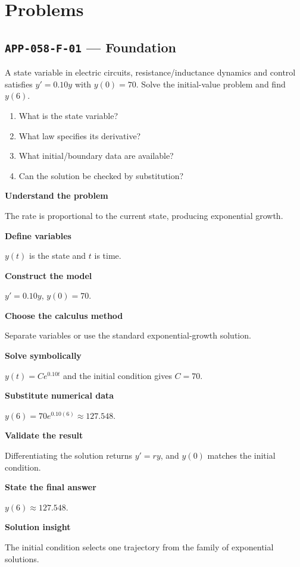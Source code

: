 \documentclass[11pt]{book}
\newcommand{\pid}[1]{\texttt{#1}}
\begin{document}
\section*{Problems}
\subsection*{\pid{APP-058-F-01} — Foundation}
\begin{problembox}
A state variable in electric circuits, resistance/inductance dynamics and control satisfies $y'=0.10y$ with $y(0)=70$. Solve the initial-value problem and find $y(6)$.
\end{problembox}
\begin{promptbox}\begin{enumerate}
\item What is the state variable?
\item What law specifies its derivative?
\item What initial/boundary data are available?
\item Can the solution be checked by substitution?
\end{enumerate}\end{promptbox}
\begin{solutionbox}
\textbf{Understand the problem}\par The rate is proportional to the current state, producing exponential growth.\par\medskip
\textbf{Define variables}\par $y(t)$ is the state and $t$ is time.\par\medskip
\textbf{Construct the model}\par $y'=0.10y$, $y(0)=70$.\par\medskip
\textbf{Choose the calculus method}\par Separate variables or use the standard exponential-growth solution.\par\medskip
\textbf{Solve symbolically}\par $y(t)=Ce^{0.10t}$ and the initial condition gives $C=70$.\par\medskip
\textbf{Substitute numerical data}\par $y(6)=70e^{0.10(6)}\approx 127.548$.\par\medskip
\textbf{Validate the result}\par Differentiating the solution returns $y'=ry$, and $y(0)$ matches the initial condition.\par\medskip
\textbf{State the final answer}\par $y(6)\approx 127.548$.\par\medskip
\textbf{Solution insight}\par The initial condition selects one trajectory from the family of exponential solutions.\par\medskip
\end{solutionbox}
\end{document}
